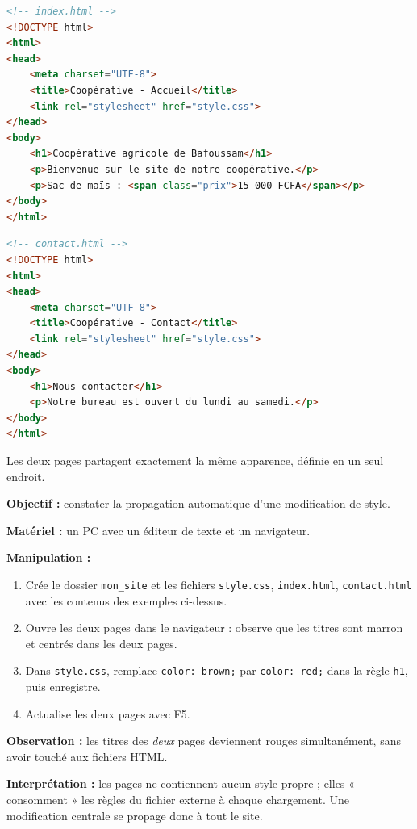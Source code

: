 \documentclass[11pt]{article}
\begin{document}
\begin{exemplebox}
\begin{lstlisting}[language=HTML]
<!-- index.html -->
<!DOCTYPE html>
<html>
<head>
    <meta charset="UTF-8">
    <title>Coopérative - Accueil</title>
    <link rel="stylesheet" href="style.css">
</head>
<body>
    <h1>Coopérative agricole de Bafoussam</h1>
    <p>Bienvenue sur le site de notre coopérative.</p>
    <p>Sac de maïs : <span class="prix">15 000 FCFA</span></p>
</body>
</html>
\end{lstlisting}
\begin{lstlisting}[language=HTML]
<!-- contact.html -->
<!DOCTYPE html>
<html>
<head>
    <meta charset="UTF-8">
    <title>Coopérative - Contact</title>
    <link rel="stylesheet" href="style.css">
</head>
<body>
    <h1>Nous contacter</h1>
    <p>Notre bureau est ouvert du lundi au samedi.</p>
</body>
</html>
\end{lstlisting}
Les deux pages partagent exactement la même apparence, définie en un seul endroit.
\end{exemplebox}

\begin{experience}
\textbf{Objectif :} constater la propagation automatique d'une modification de style.

\textbf{Matériel :} un PC avec un éditeur de texte et un navigateur.

\textbf{Manipulation :}
\begin{enumerate}
  \item Crée le dossier \texttt{mon\_site} et les fichiers \texttt{style.css}, \texttt{index.html}, \texttt{contact.html} avec les contenus des exemples ci-dessus.
  \item Ouvre les deux pages dans le navigateur : observe que les titres sont marron et centrés dans les deux pages.
  \item Dans \texttt{style.css}, remplace \texttt{color: brown;} par \texttt{color: red;} dans la règle \texttt{h1}, puis enregistre.
  \item Actualise les deux pages avec F5.
\end{enumerate}
\textbf{Observation :} les titres des \emph{deux} pages deviennent rouges simultanément, sans avoir touché aux fichiers HTML.

\textbf{Interprétation :} les pages ne contiennent aucun style propre ; elles « consomment » les règles du fichier externe à chaque chargement. Une modification centrale se propage donc à tout le site.
\end{experience}
\end{document}

